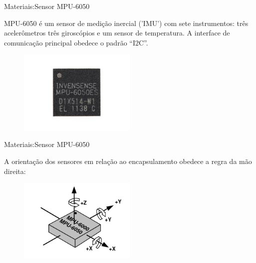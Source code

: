 \documentclass{beamer}
\begin{document}
\begin{frame}{Materiais:Sensor MPU-6050}

    MPU-6050 é um sensor de medição inercial ('IMU') com sete instrumentos: três acelerômetros três giroscópios e um sensor de temperatura. A interface de comunicação principal obedece o padrão ``I2C''.

    \begin{figure}[H]
        \centering
        \includegraphics[width=0.5\textwidth]{figuras/mpu6050-sensor-top-straight.jpg}
    \end{figure}

\end{frame}


\begin{frame}{Materiais:Sensor MPU-6050}

    A orientação dos sensores em relação ao encapsulamento obedece a regra da mão direita:

    \begin{figure}[H]
        \centering
        \includegraphics[width=0.5\textwidth]{figuras/mpu6050-diagram-axis.jpg}
    \end{figure}

\end{frame}
\end{document}
